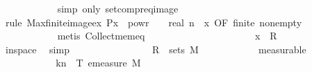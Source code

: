 \begin{isabellebody}
\ \ \ \ \ \ \ \ \ \ \isamarkupfalse%
\ {\isacharparenleft}{\kern0pt}simp\ only{\isacharcolon}{\kern0pt}\ setcompr{\isacharunderscore}{\kern0pt}eq{\isacharunderscore}{\kern0pt}image{\isacharparenright}{\kern0pt}\isanewline
\ \ \ \ \ \ \ \ \ \ \isamarkupfalse%
\ {\isacharparenleft}{\kern0pt}rule\ Max{\isacharunderscore}{\kern0pt}finite{\isacharunderscore}{\kern0pt}image{\isacharunderscore}{\kern0pt}ex{\isacharbrackleft}{\kern0pt}\ P{\isacharequal}{\kern0pt}{\isachardoublequoteopen}{\isasymlambda}x{\isachardot}{\kern0pt}\ {}\ powr\ {\isacharparenleft}{\kern0pt}{\isacharminus}{\kern0pt}\ {\isasymgamma}\ {\isacharasterisk}{\kern0pt}\ real\ n{\isacharparenright}{\kern0pt}\ {\isasymle}\ x{\isachardoublequoteclose}{\isacharcomma}{\kern0pt}\ OF\ finite\ nonempty{\isacharbrackright}{\kern0pt}{\isacharparenright}{\kern0pt}\isanewline
\ \ \ \ \ \ \ \ \ \ \isamarkupfalse%
\ {\isacharparenleft}{\kern0pt}metis\ Collect{\isacharunderscore}{\kern0pt}mem{\isacharunderscore}{\kern0pt}eq{\isacharparenright}{\kern0pt}\isanewline
\ \ \ \ \ \ \ \ \ \ \isamarkupfalse%
\isanewline
\ \ \ \ \ \ \ \ \isamarkupfalse%
\ \isamarkupfalse%
\ {\isachardoublequoteopen}x\ {\isasymin}\ {\isacharquery}{\kern0pt}R{\isachardoublequoteclose}\isanewline
\ \ \ \ \ \ \ \ \ \ \isamarkupfalse%
\ in{\isacharunderscore}{\kern0pt}space\ \isamarkupfalse%
\ simp\isanewline
\ \ \ \ \ \ \isamarkupfalse%
\isanewline
\ \ \ \ \ \ \ \ \isamarkupfalse%
\ {\isachardoublequoteopen}{\isacharquery}{\kern0pt}R\ {\isasymin}\ sets\ {\isacharquery}{\kern0pt}M{\isachardoublequoteclose}\isanewline
\ \ \ \ \ \ \ \ \ \ \isamarkupfalse%
\ measurable\isanewline
\ \ \ \ \ \ \isamarkupfalse%
\isanewline
\ \ \ \ \ \ \isamarkupfalse%
\ \isamarkupfalse%
\ {\isachardoublequoteopen}{\isachardot}{\kern0pt}{\isachardot}{\kern0pt}{\isachardot}{\kern0pt}\ {\isasymle}\ {\isacharparenleft}{\kern0pt}{\isasymSum}k{\isasymin}{\isacharbraceleft}{\kern0pt}{}{\isachardot}{\kern0pt}{\isachardot}{\kern0pt}{\isasymlfloor}{}{\isacharcircum}{\kern0pt}n\ {\isacharasterisk}{\kern0pt}\ T{\isasymrfloor}{\isacharbraceright}{\kern0pt}{\isachardot}{\kern0pt}\ emeasure\ {\isacharquery}{\kern0pt}M\ \isanewline

\end{isabellebody}
